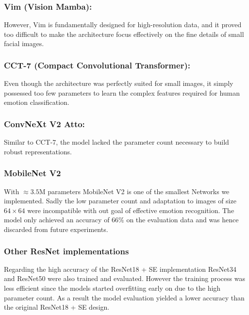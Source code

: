 \subsubsection{Vim (Vision Mamba):} However, Vim is fundamentally designed for high-resolution data, and it proved too difficult to make the architecture focus effectively on the fine details of small facial images.
\subsubsection{CCT-7 (Compact Convolutional Transformer):} Even though the architecture was perfectly suited for small images, it simply possessed too few parameters to learn the complex features required for human emotion classification.
\subsubsection{ConvNeXt V2 Atto:} Similar to CCT-7, the model lacked the parameter count necessary to build robust representations.

\subsubsection{MobileNet V2}

With $\approx 3.5$M parameters MobileNet V2 is one of the smallest Networks we implemented. Sadly the low parameter count and adaptation to images of size $64 \times 64$ were 
incompatible with out goal of effective emotion recognition. The model only achieved an accuracy of $66 \%$ on the evaluation data and was hence discarded from future experiments.

\subsubsection{Other ResNet implementations}

Regarding the high accuracy of the ResNet18 + SE implementation ResNet34 and ResNet50 were also trained and evaluated. However the training process was less efficient since 
the models started overfitting early on due to the high parameter count. As a result the model evaluation yielded a lower accuracy than the original ResNet18 + SE design.

